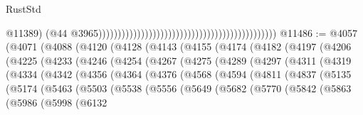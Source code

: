 \begin{lexlean}{RustStd}
\begin{coremodule}
                                                                                                @11389)
                                                                                              (@44
                                                                                                @3965))))))))))))))))))))))))))))))))))))))))))))))
@11486 := @4057
    (@4071
      (@4088
        (@4120
          (@4128
            (@4143
              (@4155
                (@4174
                  (@4182
                    (@4197
                      (@4206
                        (@4225
                          (@4233
                            (@4246
                              (@4254
                                (@4267
                                  (@4275
                                    (@4289
                                      (@4297
                                        (@4311
                                          (@4319
                                            (@4334
                                              (@4342
                                                (@4356
                                                  (@4364
                                                    (@4376
                                                      (@4568
                                                        (@4594
                                                          (@4811
                                                            (@4837
                                                              (@5135
                                                                (@5174
                                                                  (@5463
                                                                    (@5503
                                                                      (@5538
                                                                        (@5556
                                                                          (@5649
                                                                            (@5682
                                                                              (@5770
                                                                                (@5842
                                                                                  (@5863
                                                                                    (@5986
                                                                                      (@5998
                                                                                        (@6132

\end{coremodule}
\end{lexlean}
